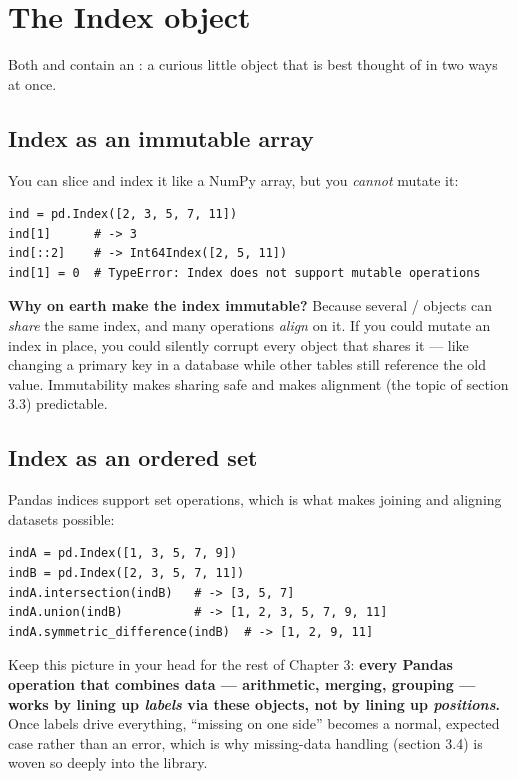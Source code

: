 \documentclass[11pt]{article}
\begin{document}
\section{The Index object}

Both  and  contain an : a curious little object that is best thought of in two ways at once.

\subsection{Index as an immutable array}

You can slice and index it like a NumPy array, but you \emph{cannot} mutate it:

\begin{lstlisting}
ind = pd.Index([2, 3, 5, 7, 11])
ind[1]      # -> 3
ind[::2]    # -> Int64Index([2, 5, 11])
ind[1] = 0  # TypeError: Index does not support mutable operations
\end{lstlisting}

\begin{background}
\textbf{Why on earth make the index immutable?} Because several / objects can \emph{share} the same index, and many operations \emph{align} on it. If you could mutate an index in place, you could silently corrupt every object that shares it --- like changing a primary key in a database while other tables still reference the old value. Immutability makes sharing safe and makes alignment (the topic of section 3.3) predictable.
\end{background}

\subsection{Index as an ordered set}

Pandas indices support set operations, which is what makes joining and aligning datasets possible:

\begin{lstlisting}
indA = pd.Index([1, 3, 5, 7, 9])
indB = pd.Index([2, 3, 5, 7, 11])
indA.intersection(indB)   # -> [3, 5, 7]
indA.union(indB)          # -> [1, 2, 3, 5, 7, 9, 11]
indA.symmetric_difference(indB)  # -> [1, 2, 9, 11]
\end{lstlisting}

\begin{keyidea}
Keep this picture in your head for the rest of Chapter 3: \textbf{every Pandas operation that combines data --- arithmetic, merging, grouping --- works by lining up \emph{labels} via these  objects, not by lining up \emph{positions}.} Once labels drive everything, ``missing on one side'' becomes a normal, expected case rather than an error, which is why missing-data handling (section 3.4) is woven so deeply into the library.
\end{keyidea}
\end{document}
